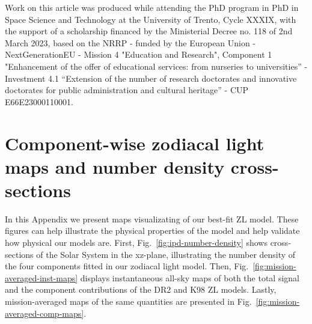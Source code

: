 \documentclass[twocolumn]{aa}
\begin{document}
\begin{acknowledgements}
  Work on this article was produced while attending the PhD program in PhD in Space 
  Science and Technology at the University of Trento, Cycle XXXIX, with the support 
  of a scholarship financed by the Ministerial Decree no. 118 of 2nd March 2023, based on the NRRP - 
  funded by the European Union - NextGenerationEU - Mission 4 "Education and Research", Component 1 
  "Enhancement of the offer of educational services: from nurseries to universities” - Investment 4.1 
  “Extension of the number of research doctorates and innovative doctorates for public administration 
  and cultural heritage” - CUP E66E23000110001.
\end{acknowledgements}


%



%

\appendix
\onecolumn

\section{Component-wise zodiacal light maps and number density cross-sections}
\label{sec:zodi-comps}

In this Appendix we present maps visualizating of our best-fit ZL 
model. These figures can help illustrate the physical properties 
of the model and help validate how physical our models are. 
First, Fig.~\ref{fig:ipd-number-density} shows cross-sections of the 
Solar System in the xz-plane, illustrating the number density of the four 
components fitted in our zodiacal light model. Then, Fig.~\ref{fig:mission-averaged-inst-maps} 
displays instantaneous all-sky maps of both the total signal and the component 
contributions of the DR2 and K98 ZL models. Lastly, mission-averaged maps of the 
same quantities are presented in Fig.~\ref{fig:mission-averaged-comp-maps}.

 



\end{document}
